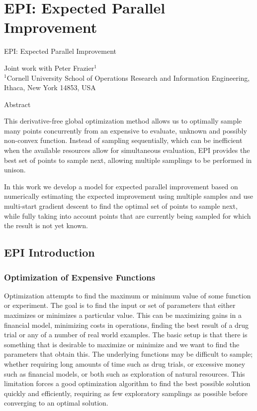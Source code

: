 \documentclass[phd,tocprelim]{cornell}
\begin{document}


\part{EPI: Expected Parallel Improvement} %
\label{prt:EPI: Expected Parallel Improvement}
\singlespacing

\noindent
\Large
EPI: Expected Parallel Improvement

\noindent
\normalsize
Joint work with Peter Frazier$^{1}$ \\
\scriptsize
$^{1}$Cornell University School of Operations Research and Information Engineering, Ithaca, New York 14853, USA
\normalsize

\normalspacing

\begin{center}
   Abstract 
\end{center}

This derivative-free global optimization method allows us to optimally sample many points concurrently from an expensive to evaluate, unknown and possibly non-convex function. Instead of sampling sequentially, which can be inefficient when the available resources allow for simultaneous evaluation, EPI provides the best set of points to sample next, allowing multiple samplings to be performed in unison.

In this work we develop a model for expected parallel improvement based on numerically estimating the expected improvement using multiple samples and use multi-start gradient descent to find the optimal set of points to sample next, while fully taking into account points that are currently being sampled for which the result is not yet known.

\chapter{EPI Introduction} %
\label{cha:EPI Introduction}

\section{Optimization of Expensive Functions}

Optimization attempts to find the maximum or minimum value of some function or experiment. The goal is to find the input or set of parameters that either maximizes or minimizes a particular value. This can be maximizing gains in a financial model, minimizing costs in operations, finding the best result of a drug trial or any of a number of real world examples. The basic setup is that there is something that is desirable to maximize or minimize and we want to find the parameters that obtain this. The underlying functions may be difficult to sample; whether requiring long amounts of time such as drug trials, or excessive money such as financial models, or both such as exploration of natural resources. This limitation forces a good optimization algorithm to find the best possible solution quickly and efficiently, requiring as few exploratory samplings as possible before converging to an optimal solution.
\end{document}
